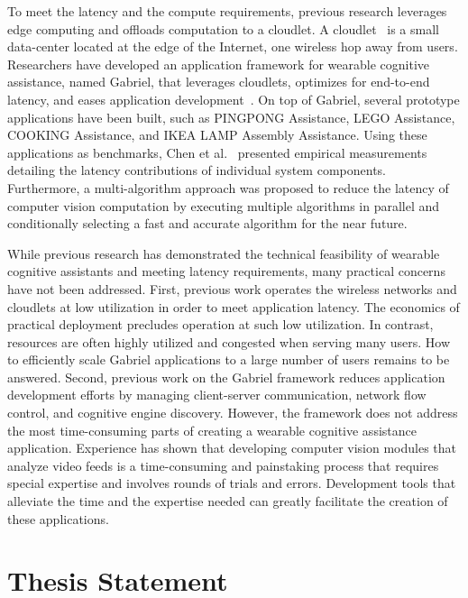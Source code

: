 To meet the latency and the compute requirements, previous research leverages
edge computing and offloads computation to a cloudlet. A
cloudlet~\cite{satyanarayanan2009case} is a small data-center located at the
edge of the Internet, one wireless hop away from users. Researchers have
developed an application framework for wearable cognitive assistance, named
Gabriel, that leverages cloudlets, optimizes for end-to-end latency, and eases
application
development~\cite{chen2018application,ha2014towards,chen2017empirical}. On top
of Gabriel, several prototype applications have been built, such as PINGPONG
Assistance, LEGO Assistance, COOKING Assistance, and IKEA LAMP Assembly
Assistance. Using these applications as benchmarks, Chen et
al.~\cite{chen2017empirical} presented empirical measurements detailing the
latency contributions of individual system components. Furthermore, a
multi-algorithm approach was proposed to reduce the latency of computer vision
computation by executing multiple algorithms in parallel and conditionally
selecting a fast and accurate algorithm for the near future.

While previous research has demonstrated the technical feasibility of wearable
cognitive assistants and meeting latency requirements, many practical concerns
have not been addressed. First, previous work operates the wireless networks and
cloudlets at low utilization in order to meet application latency. The economics
of practical deployment precludes operation at such low utilization. In
contrast, resources are often highly utilized and congested when serving many
users. How to efficiently scale Gabriel applications to a large number of users
remains to be answered. Second, previous work on the Gabriel framework reduces
application development efforts by managing client-server communication, network
flow control, and cognitive engine discovery. However, the framework does not
address the most time-consuming parts of creating a wearable cognitive
assistance application. Experience has shown that developing computer vision
modules that analyze video feeds is a time-consuming and painstaking process
that requires special expertise and involves rounds of trials and errors.
Development tools that alleviate the time and the expertise needed can greatly
facilitate the creation of these applications.


\section{Thesis Statement}

